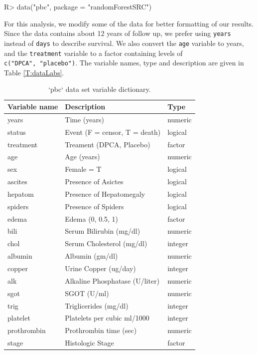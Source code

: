 \documentclass[article, nojss]{jss}
\begin{document}
\begin{Schunk}
\begin{Sinput}
R> data("pbc", package = "randomForestSRC")
\end{Sinput}
\end{Schunk}

For this analysis, we modify some of the data for better formatting of
our results. Since the data contains about 12 years of follow up, we
prefer using \texttt{years} instead of \texttt{days} to describe
survival. We also convert the \texttt{age} variable to years, and the
\texttt{treatment} variable to a factor containing levels of
\texttt{c("DPCA",\ "placebo")}. The variable names, type and description
are given in Table \ref{T:dataLabs}.

\begin{Schunk}
\begin{table}

\caption{\label{tab:dta-table}`pbc` data set variable dictionary.}
\centering
\begin{tabular}[t]{l|l|l}
\hline
Variable name & Description & Type\\
\hline
years & Time (years) & numeric\\
\hline
status & Event (F = censor, T = death) & logical\\
\hline
treatment & Treament (DPCA, Placebo) & factor\\
\hline
age & Age (years) & numeric\\
\hline
sex & Female = T & logical\\
\hline
ascites & Presence of Asictes & logical\\
\hline
hepatom & Presence of Hepatomegaly & logical\\
\hline
spiders & Presence of Spiders & logical\\
\hline
edema & Edema (0, 0.5, 1) & factor\\
\hline
bili & Serum Bilirubin (mg/dl) & numeric\\
\hline
chol & Serum Cholesterol (mg/dl) & integer\\
\hline
albumin & Albumin (gm/dl) & numeric\\
\hline
copper & Urine Copper (ug/day) & integer\\
\hline
alk & Alkaline Phosphatase (U/liter) & numeric\\
\hline
sgot & SGOT (U/ml) & numeric\\
\hline
trig & Triglicerides (mg/dl) & integer\\
\hline
platelet & Platelets per cubic ml/1000 & integer\\
\hline
prothrombin & Prothrombin time (sec) & numeric\\
\hline
stage & Histologic Stage & factor\\
\hline
\end{tabular}
\end{table}

\end{Schunk}
\end{document}
